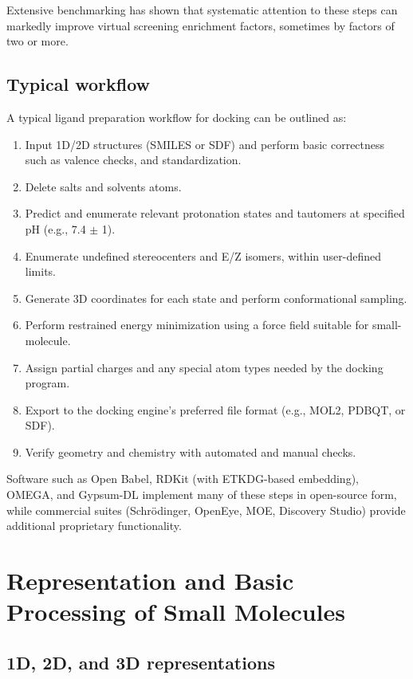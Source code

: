 \documentclass[12pt, a4paper]{article}
\begin{document}
Extensive benchmarking has shown that systematic attention to these steps can markedly improve virtual screening enrichment factors, sometimes by factors of two or more.\cite{CH6_Sastry2013,CH6_DEKOIS2}

\subsection{Typical workflow}

A typical ligand preparation workflow for docking can be outlined as:

\begin{enumerate}
  \item Input 1D/2D structures (SMILES or SDF) and perform basic correctness such as valence checks, and standardization.
  \item Delete salts and solvents atoms.
  \item Predict and enumerate relevant protonation states and tautomers at specified pH (e.g., 7.4 \(\pm\) 1).
  \item Enumerate undefined stereocenters and E/Z isomers, within user-defined limits.
  \item Generate 3D coordinates for each state and perform conformational sampling.
  \item Perform restrained energy minimization using a force field suitable for small-molecule.
  \item Assign partial charges and any special atom types needed by the docking program.
  \item Export to the docking engine's preferred file format (e.g., MOL2, PDBQT, or SDF).
  \item Verify geometry and chemistry with automated and manual checks.
\end{enumerate}

Software such as Open Babel,\cite{CH6_OBoyle2011} RDKit (with ETKDG-based embedding),\cite{CH6_Riniker2015} OMEGA,\cite{CH6_Hawkins2010} and Gypsum-DL\cite{CH6_Ropp2019} implement many of these steps in open-source form, while commercial suites (Schr\"odinger, OpenEye, MOE, Discovery Studio) provide additional proprietary functionality.

\section{Representation and Basic Processing of Small Molecules}

\subsection{1D, 2D, and 3D representations}
\end{document}
